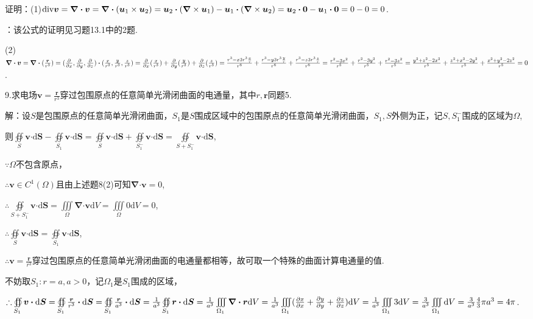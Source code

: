 \documentclass[12pt,UTF8]{ctexart}
\newcommand{\IIInt}[3]{\iiint\limits_{#1}#2\mathrm d#3}
\newcommand{\md}[1]{\mathrm d#1}
\newcommand{\pp}[2]{\frac{\partial #1}{\partial #2}}
\newcommand{\ppx}[1]{\frac{\partial #1}{\partial x}}
\newcommand{\ppy}[1]{\frac{\partial #1}{\partial y}}
\newcommand{\ppz}[1]{\frac{\partial #1}{\partial z}}
\newcommand{\varppx}[1]{\frac{\partial}{\partial x} #1}
\newcommand{\varppy}[1]{\frac{\partial}{\partial y} #1}
\newcommand{\varppz}[1]{\frac{\partial}{\partial z} #1}
\newcommand{\BSOIInt}[2]{\oiint\limits_{#1}#2}
\begin{document}
\begin{enumerate}
证明：(1)$\text{div}\bm v=\bm\nabla\bm\cdot\bm v=\bm\nabla\bm\cdot(\bm u_1\times\bm u_2)=\bm u_2\bm\cdot(\bm\nabla\times\bm u_1)-\bm u_1\bm\cdot(\bm\nabla\times\bm u_2)\\
=\bm u_2\bm\cdot\bm0-\bm u_1\bm\cdot\bm0=0-0=0$.

{：}该公式的证明见习题13.1中的2题.

(2)$\bm\nabla\bm\cdot\bm v=\bm\nabla\bm\cdot(\frac{\bm r}{r^3})=(\ppx{},\ppy{},\ppz{})\bm\cdot(\frac x{r^3},\frac y{r^3},\frac z{r^3})=\varppx{(\frac x{r^3})}+\varppy{(\frac y{r^3})}+\varppz{(\frac z{r^3})}\\
=\frac{r^3-x3r^3\frac xr}{r^6}+\frac{r^3-y3r^3\frac yr}{r^6}+\frac{r^3-z3r^3\frac zr}{r^6}=\frac{r^2-3x^2}{r^5}+\frac{r^2-3y^2}{r^5}+\frac{r^2-3z^2}{r^5}\\
=\frac{y^2+z^2-2x^2}{r^5}+\frac{z^2+x^2-2y^2}{r^5}+\frac{x^2+y^2-2z^2}{r^5}=0$.

9.求电场$\bm v=\frac{\bm r}{r^3}$穿过包围原点的任意简单光滑闭曲面的电通量，其中$r,\bm r$同题5.

解：设$S$是包围原点的任意简单光滑闭曲面，$S_1$是$S$围成区域中的包围原点的任意简单光滑闭曲面，$S_1,S$外侧为正，记$S,S_1^-$围成的区域为$\Omega$,

则$\BSOIInt S{\bm v\bm\cdot\md\bm S}-\BSOIInt{S_1}{\bm v\bm\cdot\md\bm S}=\BSOIInt S{\bm v\bm\cdot\md\bm S}+\BSOIInt{S_1^-}{\bm v\bm\cdot\md\bm S}=\BSOIInt{S+S_1^-}{\bm v\bm\cdot\md\bm S}$,

$\because\Omega$不包含原点，

$\therefore\bm v\in C^1(\Omega)$且由上述题8(2)可知$\bm\nabla\bm\cdot\bm v=0$,

$\therefore\BSOIInt{S+S_1^-}{\bm v\bm\cdot\md\bm S}=\IIInt\Omega{\bm\nabla\bm\cdot\bm v}V=\IIInt\Omega0V=0$,

$\therefore\BSOIInt S{\bm v\bm\cdot\md\bm S}=\BSOIInt{S_1}{\bm v\bm\cdot\md\bm S}$,

$\therefore\bm v=\frac{\bm r}{r^3}$穿过包围原点的任意简单光滑闭曲面的电通量都相等，故可取一个特殊的曲面计算电通量的值.

不妨取$S_1:r=a,a>0$，记$\Omega_1$是$S_1$围成的区域，

$\therefore\BSOIInt{S_1}{\bm v\bm\cdot\md\bm S}=\BSOIInt{S_1}{\frac{\bm r}{r^3}\bm\cdot\md\bm S}=\BSOIInt{S_1}{\frac{\bm r}{a^3}\bm\cdot\md\bm S}=\frac1{a^3}\BSOIInt{S_1}{\bm r\bm\cdot\md\bm S}=\frac1{a^3}\IIInt{\Omega_1}{\bm\nabla\bm\cdot\bm r}V\\
=\frac1{a^3}\IIInt{\Omega_1}{(\pp xx+\pp yy+\pp zz)}V=\frac1{a^3}\IIInt{\Omega_1}{3}V=\frac3{a^3}\IIInt{\Omega_1}{}V=\frac3{a^3}\frac43\pi a^3=4\pi$.\footnotemark{}
\end{enumerate}
\end{document}
